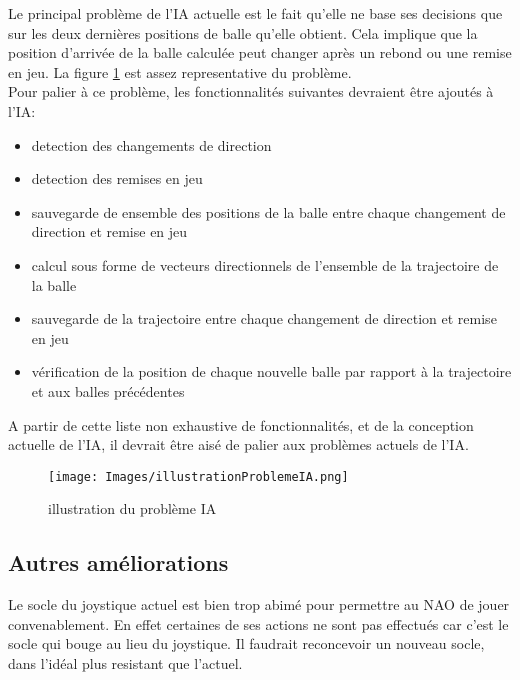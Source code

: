     \par Le principal problème de l'IA actuelle est le fait qu'elle ne base ses decisions que sur les deux dernières positions de balle qu'elle obtient.
    Cela implique que la position d'arrivée de la balle calculée peut changer après un rebond ou une remise en jeu.
    La figure \ref{fig:illustration du problème IA} est assez representative du problème. \\
    Pour palier à ce problème, les fonctionnalités suivantes devraient être ajoutés à l'IA:
    \begin{itemize}
      \item detection des changements de direction
      \item detection des remises en jeu
      \item sauvegarde de ensemble des positions de la balle entre chaque changement de direction et remise en jeu
      \item calcul sous forme de vecteurs directionnels de l'ensemble de la trajectoire de la balle
      \item sauvegarde de la trajectoire entre chaque changement de direction et remise en jeu
      \item vérification de la position de chaque nouvelle balle par rapport à la trajectoire et aux balles précédentes
    \end{itemize}
    A partir de cette liste non exhaustive de fonctionnalités, et de la conception actuelle de l'IA, il devrait être aisé de palier aux problèmes actuels de l'IA.

    \begin{figure}[!h]
      \caption{illustration du problème IA}
      \label{fig:illustration du problème IA}
      \centering
      \texttt{[image: Images/illustrationProblemeIA.png]}
    \end{figure}


  \subsection{Autres améliorations}
  \label{sub:Autres améliorations}
    \par Le socle du joystique actuel est bien trop abimé pour permettre au NAO de jouer convenablement.
    En effet certaines de ses actions ne sont pas effectués car c'est le socle qui bouge au lieu du joystique.
    Il faudrait reconcevoir un nouveau socle, dans l'idéal plus resistant que l'actuel.\\

